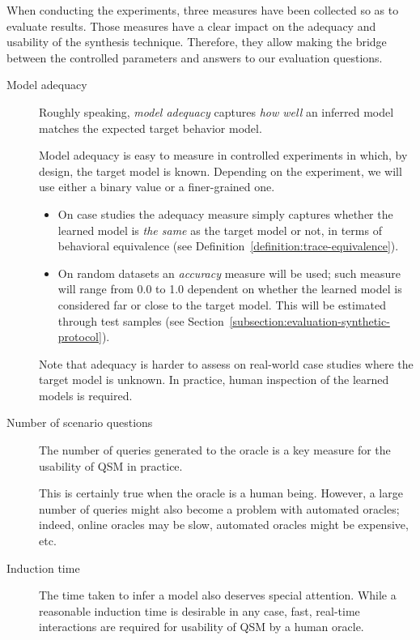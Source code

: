 When conducting the experiments, three measures have been collected so as to evaluate results. Those measures have a clear impact on the adequacy and usability of the synthesis technique. Therefore, they allow making the bridge between the controlled parameters and answers to our evaluation questions.
\begin{description}
\item[Model adequacy] Roughly speaking, \emph{model adequacy} captures \emph{how well} an inferred model matches the expected target behavior model. 

Model adequacy is easy to measure in controlled experiments in which, by design, the target model is known. Depending on the experiment, we will use either a binary value or a finer-grained one.
\begin{itemize}
\item On case studies the adequacy measure simply captures whether the learned model is \emph{the same} as the target model or not, in terms of behavioral equivalence (see Definition~\ref{definition:trace-equivalence}).
\item On random datasets an \emph{accuracy} measure will be used; such measure will range from 0.0 to 1.0 dependent on whether the learned model is considered far or close to the target model. This will be estimated through test samples (see Section~\ref{subsection:evaluation-synthetic-protocol}).
\end{itemize}
Note that adequacy is harder to assess on real-world case studies where the target model is unknown. In practice, human inspection of the learned models is required.

\item[Number of scenario questions] The number of queries generated to the oracle is a key measure for the usability of QSM in practice. 

This is certainly true when the oracle is a human being. However, a large number of queries might also become a problem with automated oracles; indeed, online oracles may be slow, automated oracles might be expensive, etc.

\item[Induction time] The time taken to infer a model also deserves special attention. While a reasonable induction time is desirable in any case, fast, real-time interactions are required for usability of QSM by a human oracle.
\end{description}

